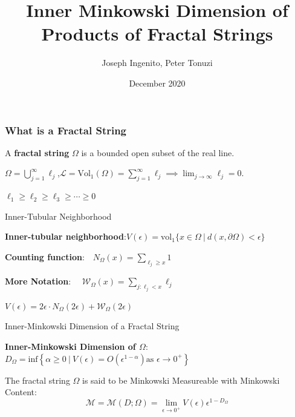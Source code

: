 \documentclass{beamer}
\title{Inner Minkowski Dimension of Products of Fractal Strings}
\author{Joseph Ingenito, Peter Tonuzi }
\institute[]{The College of New Jersey}
\date{December 2020}
\newcommand{\SL}{\mathcal{L}}
\newcommand{\SM}{\mathcal{M}}
\newcommand{\Om}{\Omega}
\newcommand{\W}{\mathcal{W}}
\begin{document}
\frame{\titlepage}

\begin{frame}
\frametitle{What is a Fractal String}

\begin{definition}
A {\bf fractal string} $\Om$ is a bounded open subset of the real line.
\end{definition}

\pause
\vspace{.2 in}

$\Omega = \displaystyle\bigcup_{j = 1}^\infty \ell_j$,\qquad $\displaystyle \SL = \text{Vol}_1\left(\Omega\right) = \sum_{j = 1}^\infty \ell_j \implies \lim_{j \to \infty} \ell_j = 0$.

\pause
\vspace{.2 in}

$\ell_1 \geq \ell_2 \geq \ell_3 \geq \cdots \geq 0$

\end{frame}

\begin{frame}{Inner-Tubular Neighborhood}

\begin{definition}
{\bf Inner-tubular neighborhood}:\quad $V(\epsilon) = \text{vol}_1\{x \in \Omega\ |\ d(x,\partial\Omega) < \epsilon\}$
\end{definition}

\pause
\vspace{.2 in}

{\bf Counting function}:$\displaystyle \quad N_{\Omega}(x) = \sum_{\ell_j \geq x}1$

\vspace{.2 in}

{\bf More Notation}: $\displaystyle \quad \W_\Om(x) = \sum_{j:\ell_j < x}{\ell_j}$

\vspace{.2 in}

$V(\epsilon) = 2\epsilon \cdot N_\Om\left(2\epsilon\right) + \W_\Om\left(2\epsilon\right)$

\end{frame}

\begin{frame}{Inner-Minkowski Dimension of a Fractal String}

\begin{definition}
{\bf Inner-Minkowski Dimension of $\Om$}: $D_\Om =\text{inf}\left\{ \alpha \geq 0\ |\ V(\epsilon)=O\left(\epsilon^{1-\alpha}\right) \text{as  } \epsilon \rightarrow 0^{+}\right\}$
\end{definition}

\pause
\vspace{.2 in}

The fractal string $\Om$ is said to be Minkowski Measureable with Minkowski Content:
$$\SM = \SM(D;\Om) = \displaystyle \lim_{\epsilon \to 0^{+}} V(\epsilon)\epsilon^{1-D_\Om}$$

\end{frame}
\end{document}
